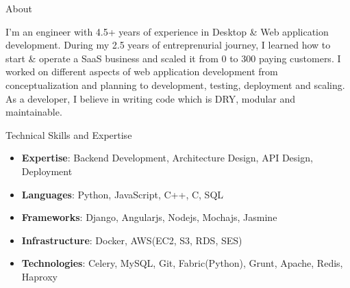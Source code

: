 \documentclass[]{mukeshcv}
\begin{document}
\thispagestyle{empty}


	\makeheader
	
	\begin{cvsection}{About}
		\begin{cvsubsection}{}{}{}
			I'm an engineer with 4.5+ years of experience in Desktop \& Web application development. During my 2.5 years of entreprenurial journey, I learned how to start \& operate a SaaS business and scaled it from 0 to 300 paying customers. I worked on different aspects of web application development from conceptualization and planning to development, testing, deployment and scaling. As a developer, I believe in writing code which is DRY, modular and maintainable.
		\end{cvsubsection}
	\end{cvsection}

	\begin{cvsection}{Technical Skills and Expertise}
		\begin{cvsubsection}{}{}{}	
			\begin{itemize}
				\item \textbf{Expertise}: Backend Development, Architecture Design, API Design, Deployment
				\item \textbf{Languages}: Python, JavaScript, C++, C, SQL
				\item \textbf{Frameworks}: Django, Angularjs, Nodejs, Mochajs, Jasmine
				\item \textbf{Infrastructure}: Docker, AWS(EC2, S3, RDS, SES)
				\item \textbf{Technologies}: Celery, MySQL, Git, Fabric(Python), Grunt, Apache, Redis, Haproxy

			\end{itemize}
		\end{cvsubsection}
	\end{cvsection}
\end{document}
